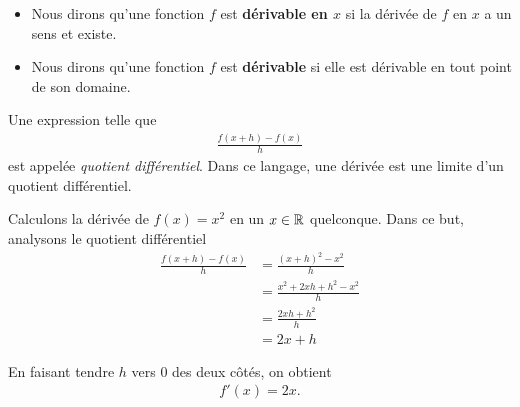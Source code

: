 \documentclass[main.tex]{subfiles}
\begin{document}
\begin{remark}
    [Dérivabilité]

    \begin{itemize}
        \item Nous dirons qu'une fonction $f$ est \textbf{dérivable en $x$}
            si la dérivée de $f$ en $x$ a un sens et existe.
        \item Nous dirons qu'une fonction $f$ est \textbf{dérivable}
            si elle est dérivable en tout point de son domaine.
    \end{itemize}
\end{remark}

\begin{remark}
    Une expression telle que
    \begin{align}
        \frac {f(x + h) - f(x)} h
    \end{align}
    est appelée \emph{quotient différentiel}.
    Dans ce langage,
    une dérivée est une limite d'un quotient différentiel.
\end{remark}

\begin{example}
    [Dérivée de $x^2$]

    Calculons la dérivée de $f(x) = x^2$ en un $x \in \mathbb{R}$ quelconque.
    Dans ce but,
    analysons le quotient différentiel
    \begin{align}
        \frac {f(x + h) - f(x)} h
        &= \frac {{(x + h)}^2 - x^2} h\\
        &= \frac {x^2 + 2xh + h^2 - x^2} h\\
        &= \frac {2xh + h^2} h\\
        &= 2x + h
    \end{align}

    En faisant tendre $h$ vers $0$ des deux côtés,
    on obtient
    \begin{align}
        f'(x) = 2x.
    \end{align}
\end{example}
\end{document}
